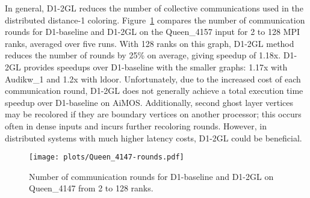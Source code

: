 In general, D1-2GL reduces the number of collective communications used in the distributed distance-1 coloring. Figure~\ref{fig:2GLrounds} compares the number of communication rounds for D1-baseline and D1-2GL on the Queen\_4157 input for 2 to 128 MPI ranks, averaged over five runs. 
With 128 ranks on this graph, D1-2GL method reduces the number of rounds by 25\% on average, giving 
speedup of 1.18x. 
D1-2GL provides speedups over D1-baseline with the smaller graphs: 1.17x with Audikw\_1 and 1.2x with ldoor.
Unfortunately, due to the increased cost of each communication round, D1-2GL does not generally achieve a total execution time speedup over D1-baseline on AiMOS. 
Additionally, second ghost layer vertices may be recolored if they are boundary vertices on another processor; this occurs often in dense inputs and incurs further recoloring rounds.
However, in distributed systems with much higher latency costs, D1-2GL could be beneficial.




\begin{figure}[h]
  \centering
  \caption{Number of communication rounds for D1-baseline and D1-2GL on Queen\_4147 from 2 to 128 ranks.}
  \texttt{[image: plots/Queen\_4147-rounds.pdf]}
  \label{fig:2GLrounds}
\end{figure}


